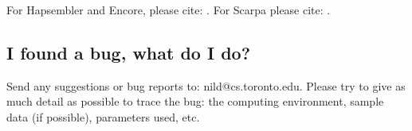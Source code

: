 \documentclass[12pt,a4paper]{report}
\begin{document}
For Hapsembler and Encore, please cite: \cite{donmez11}. For Scarpa please cite: \cite{donmez13}.

\subsection{I found a bug, what do I do?}

Send any suggestions or bug reports to: nild@cs.toronto.edu. Please try to give as much detail as possible to trace the bug: the computing environment, sample data (if possible), parameters used, etc.



\end{document}
